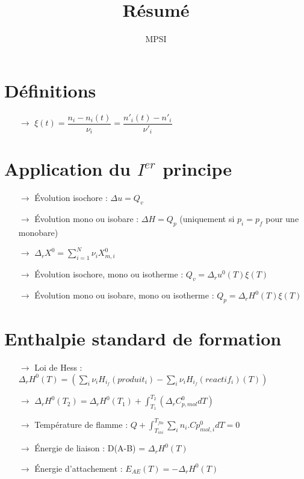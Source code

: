 \documentclass[a4paper,12pt,oneside]{report}
\title{Résumé}
\author{MPSI}
\begin{document}
\section{Définitions}
\begin{itemize}
 \item[$\rightarrow$] $\xi(t) = \dfrac{n_i-n_i(t)}{\nu_i} = \dfrac{n'_i(t)-n'_i}{\nu'_i}$
\end{itemize}
\section{Application du $I^{er}$ principe}
\begin{itemize}
 \item[$\rightarrow$] Évolution isochore : $\Delta u = Q_v$\\
 \item[$\rightarrow$] Évolution mono ou isobare : $\Delta H = Q_p$ (uniquement si $p_i=p_f$ pour une monobare)\\
 \item[$\rightarrow$] $\Delta_rX^0 = \sum_{i=1}^N \nu_i X^0_{m,i}$\\
 \item[$\rightarrow$] Évolution isochore, mono ou isotherme : $Q_v = \Delta_ru^0(T)\xi(T)$\\
\item[$\rightarrow$] Évolution mono ou isobare, mono ou isotherme : $Q_p = \Delta_rH^0(T)\xi(T)$\\
\end{itemize}
\section{Enthalpie standard de formation}
\begin{itemize}
 \item[$\rightarrow$] Loi de Hess : $\Delta_r H^0 (T) = (\sum_i \nu_i H_{i_f} (produit_i) - \sum_i \nu_i H_{i_f} (reactif_i)(T))$\\
 \item[$\rightarrow$] $\Delta_r H^0(T_2) = \Delta_r H^0(T_1) + \int_{T_1}^{T_2}(\Delta_rC^0_{p,mol} dT)$\\
 \item[$\rightarrow$] Température de flamme : $Q + \int_{T_{ini}}^{T_{fla}} \sum_i n_i.Cp_{mol,i}^0 dT = 0$\\
\item[$\rightarrow$] Énergie de liaison : D(A-B) = $\Delta_rH^0(T)$\\
 \item[$\rightarrow$] Énergie d'attachement : $E_{AE}(T) = -\Delta_r H^0(T)$

\end{itemize}
\end{document}
